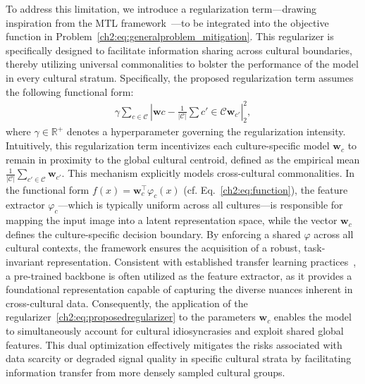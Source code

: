 To address this limitation, we introduce a regularization term—drawing inspiration from the MTL framework~\citep{zhang2018overview}—to be integrated into the objective function in Problem~\eqref{ch2:eq:generalproblem_mitigation}. This regularizer is specifically designed to facilitate information sharing across cultural boundaries, thereby utilizing universal commonalities to bolster the performance of the model in every cultural stratum.
Specifically, the proposed regularization term assumes the following functional form:
%
\begin{align}
\label{ch2:eq:proposedregularizer}
\gamma \sum_{c \in \mathcal{C}} \left| \boldsymbol{w}{c} - \frac{1}{|\mathcal{C}|} \sum{c' \in \mathcal{C}} \boldsymbol{w}_{c'} \right|_2^2,
\end{align}
%
where $\gamma \in \mathbb{R}^+$ denotes a hyperparameter governing the regularization intensity.
Intuitively, this regularization term incentivizes each culture-specific model $\boldsymbol{w}_{c}$ to remain in proximity to the global cultural centroid, defined as the empirical mean $\frac{1}{|\mathcal{C}|} \sum_{c' \in \mathcal{C}} \boldsymbol{w}_{c'}$. 
This mechanism explicitly models cross-cultural commonalities. 
In the functional form $f(x) = \boldsymbol{w}_c^\top \varphi_c(x)$ (cf. Eq.~\eqref{ch2:eq:function}), the feature extractor $\varphi_c$—which is typically uniform across all cultures—is responsible for mapping the input image into a latent representation space, while the vector $\boldsymbol{w}_c$ defines the culture-specific decision boundary. 
By enforcing a shared $\varphi$ across all cultural contexts, the framework ensures the acquisition of a robust, task-invariant representation. 
Consistent with established transfer learning practices~\citep{shu2021zoo}, a pre-trained backbone is often utilized as the feature extractor, as it provides a foundational representation capable of capturing the diverse nuances inherent in cross-cultural data.
Consequently, the application of the regularizer~\eqref{ch2:eq:proposedregularizer} to the parameters $\boldsymbol{w}_{c}$ enables the model to simultaneously account for cultural idiosyncrasies and exploit shared global features. This dual optimization effectively mitigates the risks associated with data scarcity or degraded signal quality in specific cultural strata by facilitating information transfer from more densely sampled cultural groups.

